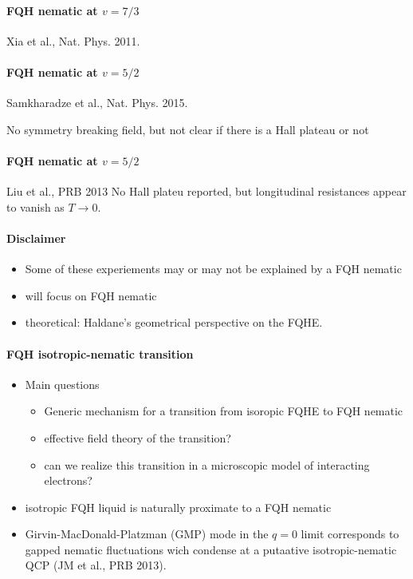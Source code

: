 \documentclass{article}
\numberwithin{equation}{subsection} %
\theoremstyle{definition}
\begin{document}
\paragraph{FQH nematic at $v=7/3$} Xia et al., Nat. Phys. 2011.

\paragraph{FQH nematic at $v=5/2$} Samkharadze et al., Nat. Phys. 2015.

No symmetry breaking field, but not clear if there is a Hall plateau or
not

\paragraph{FQH nematic at $v=5/2$} Liu et al., PRB 2013 No Hall plateu
reported, but longitudinal resistances appear to vanish as $T\to 0$.

\paragraph{Disclaimer}
\begin{itemize}
    \item Some of these experiements may or may not be explained by a FQH
        nematic
    \item will focus on FQH nematic
    \item theoretical: Haldane's geometrical perspective on the FQHE.
\end{itemize}
\paragraph{FQH isotropic-nematic transition}
\begin{itemize}
    \item Main questions
        \begin{itemize} 
            \item Generic mechanism for a transition from
            isoropic FQHE to FQH nematic 
            \item effective field theory of
            the transition?  
            \item can we realize this transition in a
            microscopic model of interacting electrons?  
        \end{itemize}
    \item isotropic FQH liquid is naturally proximate to a FQH nematic
    \item Girvin-MacDonald-Platzman (GMP) mode in the $q=0$ limit
        corresponds to gapped nematic fluctuations wich condense at a
        putaative isotropic-nematic QCP (JM et al., PRB 2013).
\end{itemize}
\end{document}
